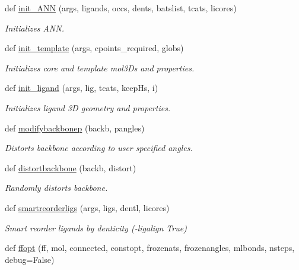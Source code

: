 \begin{DoxyCompactItemize}
def \hyperlink{namespacemolSimplify_1_1Scripts_1_1structgen_a0143758ce0284cc6b662a5ac5f39818b}{init\+\_\+\+A\+NN} (args, ligands, occs, dents, batslist, tcats, licores)
\begin{DoxyCompactList}\small\item\em Initializes A\+NN. \end{DoxyCompactList}\item 
def \hyperlink{namespacemolSimplify_1_1Scripts_1_1structgen_a761d405f3ea62ef631fb78791ef9db90}{init\+\_\+template} (args, cpoints\+\_\+required, globs)
\begin{DoxyCompactList}\small\item\em Initializes core and template mol3\+Ds and properties. \end{DoxyCompactList}\item 
def \hyperlink{namespacemolSimplify_1_1Scripts_1_1structgen_a3687ca508aa4390f1964ead5ce0411db}{init\+\_\+ligand} (args, lig, tcats, keep\+Hs, i)
\begin{DoxyCompactList}\small\item\em Initializes ligand 3D geometry and properties. \end{DoxyCompactList}\item 
def \hyperlink{namespacemolSimplify_1_1Scripts_1_1structgen_a54f5af396e8da068c110f90043ba9621}{modifybackbonep} (backb, pangles)
\begin{DoxyCompactList}\small\item\em Distorts backbone according to user specified angles. \end{DoxyCompactList}\item 
def \hyperlink{namespacemolSimplify_1_1Scripts_1_1structgen_a4f54c3884321f27f7791785de3a348d1}{distortbackbone} (backb, distort)
\begin{DoxyCompactList}\small\item\em Randomly distorts backbone. \end{DoxyCompactList}\item 
def \hyperlink{namespacemolSimplify_1_1Scripts_1_1structgen_ace8c0eaa680157fc0242697a53a847a8}{smartreorderligs} (args, ligs, dentl, licores)
\begin{DoxyCompactList}\small\item\em Smart reorder ligands by denticity (-\/ligalign True) \end{DoxyCompactList}\item 
def \hyperlink{namespacemolSimplify_1_1Scripts_1_1structgen_a1c48077780530e1f82a2048b3e4e47e2}{ffopt} (ff, mol, connected, constopt, frozenats, frozenangles, mlbonds, nsteps, debug=False)

\end{DoxyCompactItemize}
